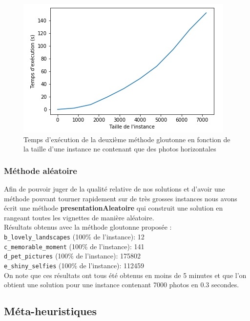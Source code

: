 \documentclass[12pt,a4paper]{article}
\begin{document}
\begin{figure}[!h]
\centering
\includegraphics[scale=0.8]{CourbeGlouton2.png}
\caption{Temps d'exécution de la deuxième méthode gloutonne en fonction de la taille d'une instance ne contenant que des photos horizontales }
\end{figure}

\subsubsection{Méthode aléatoire}

\vspace{1\baselineskip}

\noindent Afin de pouvoir juger de la qualité relative de nos solutions et d'avoir une méthode pouvant tourner rapidement sur de très grosses instances nous avons écrit une méthode \textbf{presentationAleatoire} qui construit une solution en rangeant toutes les vignettes de manière aléatoire.
\vspace{.5\baselineskip}\\
Résultats obtenus avec la méthode gloutonne proposée :
\vspace{.5\baselineskip}\\
\verb|b_lovely_landscapes| (100\% de l'instance): 12  \\
\verb|c_memorable_moment| (100\% de l'instance): 141 \\ 
\verb|d_pet_pictures| (100\% de l'instance): 175802  \\
\verb|e_shiny_selfies| (100\% de l'instance): 112459
\vspace{1\baselineskip}\\
On note que ces résultats ont tous été obtenus en moins de 5 minutes et que l'on obtient une solution pour une instance contenant 7000 photos en 0.3 secondes.

\subsection{Méta-heuristiques}
\end{document}
